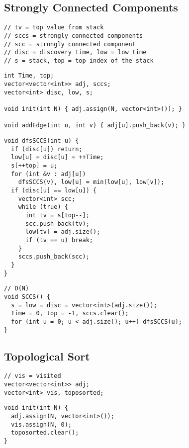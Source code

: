 \documentclass[twoside]{article}
\begin{document}
\begin{multicols*}{2}
\subsection*{Strongly Connected Components}
\begin{verbatim}
// tv = top value from stack
// sccs = strongly connected components
// scc = strongly connected component
// disc = discovery time, low = low time
// s = stack, top = top index of the stack
\end{verbatim}
\vspace{-12pt}
\begin{verbatim}
int Time, top;
vector<vector<int>> adj, sccs;
vector<int> disc, low, s;

void init(int N) { adj.assign(N, vector<int>()); }

void addEdge(int u, int v) { adj[u].push_back(v); }
\end{verbatim}
\vspace{-12pt}
\begin{verbatim}
void dfsSCCS(int u) {
  if (disc[u]) return;
  low[u] = disc[u] = ++Time;
  s[++top] = u;
  for (int &v : adj[u])
    dfsSCCS(v), low[u] = min(low[u], low[v]);
  if (disc[u] == low[u]) {
    vector<int> scc;
    while (true) {
      int tv = s[top--];
      scc.push_back(tv);
      low[tv] = adj.size();
      if (tv == u) break;
    }
    sccs.push_back(scc);
  }
}
\end{verbatim}
\vspace{-12pt}
\begin{verbatim}
// O(N)
void SCCS() {
  s = low = disc = vector<int>(adj.size());
  Time = 0, top = -1, sccs.clear();
  for (int u = 0; u < adj.size(); u++) dfsSCCS(u);
}
\end{verbatim}

\subsectionfont{\large\bfseries\sffamily\underline}
\subsection*{Topological Sort}
\begin{verbatim}
// vis = visited
vector<vector<int>> adj;
vector<int> vis, toposorted;
\end{verbatim}
\vspace{-12pt}
\begin{verbatim}
void init(int N) {
  adj.assign(N, vector<int>());
  vis.assign(N, 0);
  toposorted.clear();
}


\end{verbatim}
\end{multicols*}
\end{document}
